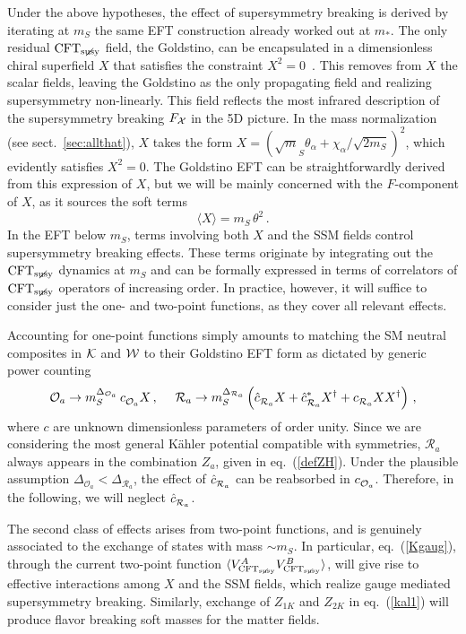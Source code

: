\documentclass[a4paper,12pt]{article}
\newcommand{\beq}{\begin{equation}}
\newcommand{\eeq}{\end{equation}}
\def\eq#1{eq.~(\ref{#1})}
\def\eq#1{eq.~(\ref{#1})}
\def\sec#1{sect.~\ref{#1}}
\def\O{\mathcal{O}}
\def\R{\mathcal{R}}
\def\mst{m_*}
\def\mS{m_S}
\def\CFTs{{\rm CFT}_ {{\rm susy}\! \! \! \! \! \! \! \!\diagup \,\,\,}}
\begin{document}
Under the above hypotheses, the effect of supersymmetry breaking is derived by iterating at $\mS$  the same EFT construction already worked out at $\mst$.
The only residual $\CFTs$ field,  the Goldstino, can be encapsulated in a dimensionless chiral superfield ${X}$ that satisfies the constraint $X^2=0$~\cite{Komargodski:2009rz}. This removes from $X$ the scalar fields, leaving the Goldstino as the only propagating field and realizing supersymmetry non-linearly.  This field reflects the most infrared description of the supersymmetry breaking $F_{\cal X}$ in the 5D picture. In the mass normalization (see \sec{sec:allthat}), $X$ takes the form $X=(\sqrt \mS \theta_\alpha+\chi_\alpha/ \sqrt {2 \mS})^2$, which evidently satisfies $X^2=0$. The Goldstino EFT can be  straightforwardly derived from this expression of ${X}$, but we will be mainly concerned with the $F$-component of $X$, as it sources the soft terms 
\beq
\langle X\rangle =\mS\, \theta^2 \, .
\label{vevX}
\eeq
In the EFT below $\mS$, terms involving both $X$ and the SSM fields control
supersymmetry breaking effects. These terms originate by integrating out the $\CFTs$ dynamics at $\mS$ and can
be formally expressed in terms of correlators of $\CFTs$ operators of increasing order. In practice, however,
it will suffice to consider just the one- and two-point functions, as they cover all relevant effects.

Accounting for one-point functions simply amounts to matching   the SM neutral composites in ${\cal K}$ and ${\cal W}$
to their Goldstino EFT form as dictated by generic power counting
\beq
\O_a \to \mS^{\Delta_{\O_a}} \, c_{\raisebox{-1.0pt}{$\scriptstyle {{\O}_a}$}} X \, , ~~~~
\R_a \to \mS^{\Delta_{\R_a}} \left( {\hat c}_{\raisebox{-1.0pt}{$\scriptstyle {{\R}_a}$}} X + {\hat c}^*_{\raisebox{-1.0pt}{$\scriptstyle {{\R}_a}$}} X^\dagger + c_{\raisebox{-1.0pt}{$\scriptstyle {{\R}_a}$}} XX^\dagger \right) \, ,
\label{replac}
\eeq
where $c$ are unknown dimensionless parameters of order unity.  
Since we are considering the most general K\"ahler potential compatible with symmetries, $\R_a$ always appears in the combination $Z_a$, given in \eq{defZH}. Under the plausible assumption $\Delta_{\O_a} < \Delta_{\R_a}$, the effect of ${\hat c}_{\raisebox{-1.0pt}{$\scriptstyle {{\R}_a}$}}$ can be reabsorbed in $c_{\raisebox{-1.0pt}{$\scriptstyle {{\O}_a}$}}$. Therefore, in the following, we will neglect ${\hat c}_{\raisebox{-1.0pt}{$\scriptstyle {{\R}_a}$}}$. 

The second class of effects arises from two-point functions, and is genuinely associated to the exchange of states with mass $\sim \mS$. In particular,
\eq{Kgaug}, through the current two-point function $\langle V_{\CFTs}^A
V_{\CFTs}^B\rangle$, will give rise to effective interactions among $X$ and the SSM fields, which realize gauge mediated supersymmetry breaking. Similarly, exchange of $Z_{1K}$ and $Z_{2K}$ in \eq{kal1} will produce flavor breaking soft masses for the matter fields.
\end{document}
